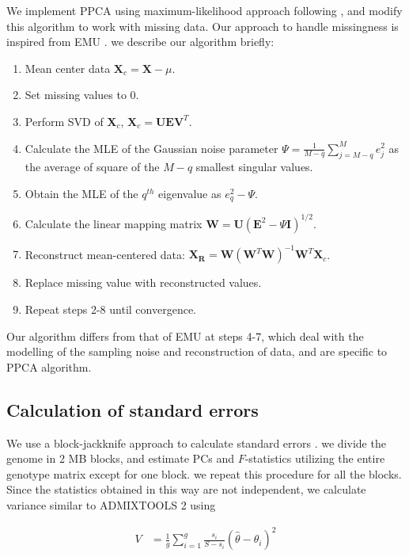 \documentclass[12pt]{article}
\newcommand{\BW}{\mathbf{W}}
\newcommand{\BI}{\mathbf{I}}
\newcommand{\MX}{\mathbf{X}}
\begin{document}
We implement PPCA using maximum-likelihood approach following \cite{tipping_probabilistic_1999-1}, and modify this algorithm to work with missing data. Our approach to handle missingness is inspired from EMU \citep{meisner_large-scale_2021}. we describe our algorithm briefly:
\begin{enumerate}
    \item Mean center data $\MX_c = \MX - \mu$.
    \item Set missing values to 0.
    \item Perform SVD of $\MX_c$, $\MX_c = \mathbf{UEV}^T$.
    \item Calculate the MLE of the Gaussian noise parameter $\Psi = \frac{1}{M-q} \sum_{j=M-q}^ M e_j^2$ as the average of square of the $M-q$ smallest singular values.
    \item Obtain the MLE of the $q^{th}$ eigenvalue as $e_q^2 - \Psi$.
    \item Calculate the linear mapping matrix $\BW = \mathbf{U} (\mathbf{E}^2 - \Psi\BI)^{1/2}$.
    \item Reconstruct mean-centered data: $\mathbf{X_R} = \BW(\BW^T\BW)^{-1}\BW^T\MX_c$.
    \item Replace missing value with reconstructed values.
    \item Repeat steps 2-8 until convergence.
\end{enumerate}

Our algorithm differs from that of EMU at steps 4-7, which deal with the modelling of the sampling noise and reconstruction of data, and are specific to PPCA algorithm.

\subsection{Calculation of standard errors}

We use a block-jackknife approach to calculate standard errors \citep{kunsch_jackknife_1989, maier_limits_2022, patterson_modication_2020}. we divide the genome in 2 MB blocks, and estimate PCs and $F$-statistics utilizing the entire genotype matrix except for one block. we repeat this procedure for all the blocks. Since the statistics obtained in this way are not independent, we calculate variance similar to ADMIXTOOLS 2 using 

\begin{align}\label{eq:bjk_var}
V &= \frac{1}{g} \sum_{i=1}^g \frac{s_i}{S-s_i} (\hat{\theta} - \theta_i)^2
\end{align}
\end{document}
